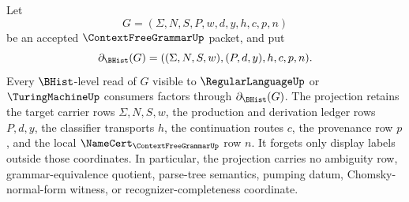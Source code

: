 \begin{lemma}
\label{lem:contextfreegrammar-bhist-forgetful-projection-boundary}
Let
$$
G=(\Sigma,N,S,P,w,d,y,h,c,p,n)
$$
be an accepted $\ContextFreeGrammarUp$ packet, and put
$$
\partial_{\BHist}(G)=((\Sigma,N,S,w),(P,d,y),h,c,p,n).
$$
Every $\BHist$-level read of $G$ visible to $\RegularLanguageUp$ or
$\TuringMachineUp$ consumers factors through $\partial_{\BHist}(G)$. The
projection retains the target carrier rows $\Sigma,N,S,w$, the production and
derivation ledger rows $P,d,y$, the classifier transports $h$, the
continuation routes $c$, the provenance row $p$, and the local
$\NameCert_{\ContextFreeGrammarUp}$ row $n$. It forgets only display labels
outside those coordinates. In particular, the projection carries no ambiguity
row, grammar-equivalence quotient, parse-tree semantics, pumping datum,
Chomsky-normal-form witness, or recognizer-completeness coordinate.
\end{lemma}
